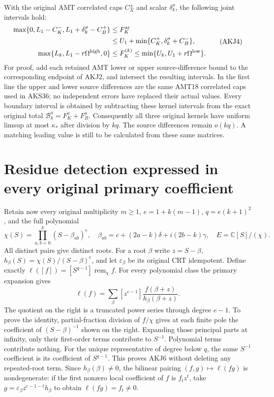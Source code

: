 \documentclass[11pt,a4paper]{article}
\begin{document}
With the original AMT correlated caps $C_X^\pm$ and scalar
$\delta_k^\sigma$, the following joint intervals hold:
\[
\begin{split}
 \max\{0,L_1-C_K^-,L_1+\delta_k^\sigma-C_B^+\}
 &\le F_K^{\rm ar}\\
 &\le U_1+\min\{C_K^+,\delta_k^\sigma+C_B^-\},\\
 \max\{L_k,L_1-r\Omega^{\rm high},0\}
 &\le F_K^{(k)}
 \le\min\{U_k,U_1+r\Omega^{\rm low}\}.
\end{split}\tag{AKJ4}
\]
For proof, add each retained AMT lower or upper source-difference bound
to the corresponding endpoint of AKJ2, and intersect the resulting
intervals. In the first line the upper and lower source differences
are the same AMT18 correlated caps used in AKS36; no independent errors
have replaced their actual values. Every boundary interval is obtained
by subtracting these kernel intervals from the exact original total
$\mathcal B_k^a=F_K^a+F_B^a$. Consequently all three original kernels
have uniform limsup at most $\kappa_*$ after division by $kq$.
The source differences remain $o(kq)$. A matching leading value is
still to be calculated from these same matrices.

\section{Residue detection expressed in every original primary coefficient}
Retain now every original multiplicity $m\ge1$, $e=1+k(m-1)$,
$q=e(k+1)^2$, and the full polynomial
\[
 \chi(S)=\prod_{a,b=0}^k(S-\beta_{ab})^e,
 \quad \beta_{ab}=c+(2a-k)\delta+i(2b-k)\gamma,
 \quad E=\mathbb C[S]/(\chi).
 \tag{AKJ5}
\]
All distinct pairs give distinct roots. For a root $\beta$ write
$z=S-\beta$, $h_\beta(S)=\chi(S)/(S-\beta)^e$, and let
$\varepsilon_\beta$ be its original CRT idempotent. Define exactly
$\ell([f])=[S^{q-1}]\operatorname{rem}_\chi f$.
For every polynomial class the primary expansion gives
\[
 \ell(f)=\sum_\beta[z^{e-1}]
       \frac{f(\beta+z)}{h_\beta(\beta+z)}.
 \tag{AKJ6}
\]
The quotient on the right is a truncated power series through degree
$e-1$. To prove the identity, partial-fraction division of $f/\chi$
gives at each finite pole the coefficient of $(S-\beta)^{-1}$ shown
on the right. Expanding those principal parts at infinity, only their
first-order terms contribute to $S^{-1}$. Polynomial terms contribute
nothing. For the unique representative of degree below $q$, the same
$S^{-1}$ coefficient is its coefficient of $S^{q-1}$. This proves AKJ6
without deleting any repeated-root term. Since $h_\beta(\beta)\ne0$,
the bilinear pairing $(f,g)\mapsto\ell(fg)$ is nondegenerate: if the
first nonzero local coefficient of $f$ is $f_tz^t$, take
$g=\varepsilon_\beta z^{e-1-t}h_\beta$ to obtain $\ell(fg)=f_t\ne0$.
\end{document}
